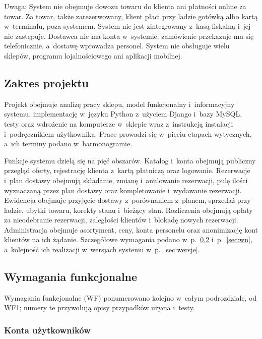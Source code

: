 \documentclass[12pt,a4paper,oneside]{article}
\newcounter{pu}
\begin{document}
Uwaga: System nie obejmuje dowozu towaru do klienta ani płatności online za towar. Za towar, także zarezerwowany, klient płaci przy ladzie gotówką albo kartą w~terminalu, poza systemem. System nie jest zintegrowany z~kasą fiskalną i~jej nie zastępuje. Dostawca nie ma konta w~systemie: zamówienie przekazuje mu się telefonicznie, a~dostawę wprowadza personel. System nie obsługuje wielu sklepów, programu lojalnościowego ani aplikacji mobilnej.

\subsection{Zakres projektu}
\label{sec:zakres}

Projekt obejmuje analizę pracy sklepu, model funkcjonalny i~informacyjny systemu, implementację w~języku Python z~użyciem Django i~bazy MySQL, testy oraz wdrożenie na komputerze w~sklepie wraz z~instrukcją instalacji i~podręcznikiem użytkownika. Prace prowadzi się w~pięciu etapach wytycznych, a~ich terminy podano w~harmonogramie.

Funkcje systemu dzielą się na pięć obszarów. Katalog i~konta obejmują publiczny przegląd oferty, rejestrację klienta z~kartą płatniczą oraz logowanie. Rezerwacje i~plan dostawy obejmują składanie, zmianę i~anulowanie rezerwacji, pulę ilości wyznaczaną przez plan dostawy oraz kompletowanie i~wydawanie rezerwacji. Ewidencja obejmuje przyjęcie dostawy z~porównaniem z~planem, sprzedaż przy ladzie, ubytki towaru, korekty stanu i~bieżący stan. Rozliczenia obejmują opłaty za nieodebranie rezerwacji, zaległości klientów i~blokadę nowych rezerwacji. Administracja obejmuje asortyment, ceny, konta personelu oraz anonimizację kont klientów na ich żądanie. Szczegółowe wymagania podano w~p.~\ref{sec:wf} i~p.~\ref{sec:wn}, a~kolejność ich realizacji w~wersjach systemu w~p.~\ref{sec:wersje}.

\subsection{Wymagania funkcjonalne}
\label{sec:wf}

Wymagania funkcjonalne (WF) ponumerowano kolejno w~całym podrozdziale, od WF1; numery te przywołują opisy przypadków użycia i~testy.

\subsubsection{Konta użytkowników}
\end{document}
